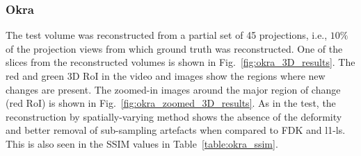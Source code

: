 \documentclass[journal]{IEEEtran}
\begin{document}
\subsubsection{\textbf{Okra}}
\label{Sec:okra_spatially_varying}
The test volume was reconstructed from a partial set of
45 projections, i.e., $10\%$ of the projection views from which ground
truth was reconstructed. One of the slices from the reconstructed volumes 
is shown in Fig.~\ref{fig:okra_3D_results}. The red and green 3D
RoI in the video and images show the regions where new changes are
present. The zoomed-in images around the major region of change (red
RoI) is shown in Fig.~\ref{fig:okra_zoomed_3D_results}. As in the
test, the reconstruction by spatially-varying method shows the absence
of the deformity and better removal of sub-sampling artefacts when
compared to FDK and l1-ls. This is also seen in the SSIM values in
Table~\ref{table:okra_ssim}.

\end{document}
